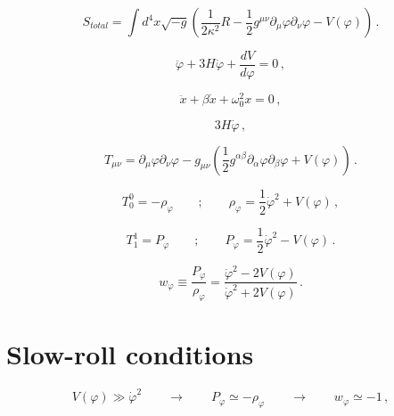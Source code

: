 \begin{equation}
S_{total} = \int d^4 x \sqrt{-g} \left( \frac{1}{2 \kappa^2} R -\frac{1}{2}g^{\mu \nu} \partial_{\mu} \varphi \partial_{\nu} \varphi - V(\varphi) \right) \, .
\label{equation:2.2.9}
\end{equation}

\begin{equation}
\ddot{\varphi} + 3 H \dot{\varphi} + \dfrac{d V}{d \varphi} = 0 \, ,
\label{equation:2.2.10}
\end{equation}

\begin{equation}
\ddot{x} + \beta \dot{x} + \omega_0^2 x = 0 \, ,
\label{equation:2.2.11}
\end{equation}

\begin{equation}
3 H \dot{\varphi}\, ,
\label{equation:2.2.12}
\end{equation}

\begin{equation}
T_{\mu \nu} = \partial_{\mu}\varphi \partial_{\nu}\varphi - g_{\mu \nu} \left( \frac{1}{2}g^{\alpha \beta} \partial_{\alpha}\varphi \partial_{\beta}\varphi + V(\varphi) \right) \, .
\label{equation:2.2.13} 
\end{equation}

\begin{equation}
T^0_0 = -\rho_{\varphi} \qquad ; \qquad \rho_{\varphi} = \frac{1}{2}\dot{\varphi}^2 + V(\varphi) \, ,
\label{equation:2.2.14}
\end{equation} 

\begin{equation}
T^1_1 = P_{\varphi} \qquad ; \qquad P_{\varphi} = \frac{1}{2}\dot{\varphi}^2 - V(\varphi) \, .
\label{equation:2.2.15}
\end{equation}

\begin{equation}
w_{\varphi} \equiv \frac{P_{\varphi}}{\rho_{\varphi}} = \frac{\dot{\varphi}^2 - 2 V(\varphi)}{\dot{\varphi}^2 + 2 V(\varphi)} \, .
\label{equation:2.2.16}
\end{equation}

\section{Slow-roll conditions}
\label{section:2.3}

\begin{equation}
V(\varphi) \gg \dot{\varphi}^2 \qquad \longrightarrow \qquad P_{\varphi} \simeq -\rho_{\varphi} \qquad \longrightarrow \qquad w_{\varphi} \simeq -1 \, ,
\label{equation:2.3.1} 
\end{equation}

